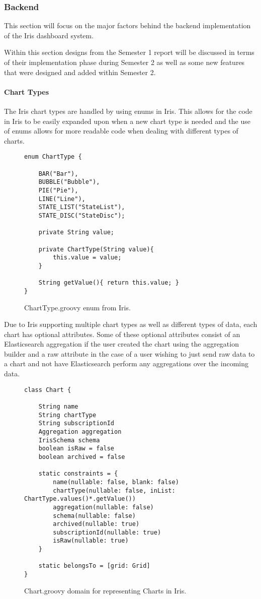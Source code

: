 \documentclass[12pt,a4paper,titlepage]{report}
\begin{document}
\subsubsection{Backend}
This section will focus on the major factors behind the backend implementation of the Iris dashboard system.

Within this section designs from the Semester 1 report will be discussed in terms of their implementation phase during Semester 2 as well as some new features that were designed and added within Semester 2.
\paragraph{Chart Types}
The Iris chart types are handled by using enums in Iris. This allows for the code in Iris to be easily expanded upon when a new chart type is needed and the use of enums allows for more readable code when dealing with different types of charts.

\begin{figure}[H]
\begin{tcolorbox}
\begin{verbatim}
enum ChartType {

    BAR("Bar"),
    BUBBLE("Bubble"),
    PIE("Pie"),
    LINE("Line"),
    STATE_LIST("StateList"),
    STATE_DISC("StateDisc");

    private String value;

    private ChartType(String value){
        this.value = value;
    }

    String getValue(){ return this.value; }
}
\end{verbatim}
\end{tcolorbox}
\caption{ChartType.groovy enum from Iris.}
\end{figure}
Due to Iris supporting multiple chart types as well as different types of data, each chart has optional attributes. Some of these optional attributes consist of an Elasticsearch aggregation if the user created the chart using the aggregation builder and a raw attribute in the case of a user wishing to just send raw data to a chart and not have Elasticsearch perform any aggregations over the incoming data.
\begin{figure}[H]
\begin{tcolorbox}
\begin{verbatim}
class Chart {

    String name
    String chartType
    String subscriptionId
    Aggregation aggregation
    IrisSchema schema
    boolean isRaw = false
    boolean archived = false

    static constraints = {
        name(nullable: false, blank: false)
        chartType(nullable: false, inList: ChartType.values()*.getValue())
        aggregation(nullable: false)
        schema(nullable: false)
        archived(nullable: true)
        subscriptionId(nullable: true)
        isRaw(nullable: true)
    }

    static belongsTo = [grid: Grid]
}
\end{verbatim}
\end{tcolorbox}
\caption{Chart.groovy domain for representing Charts in Iris.}
\end{figure}
\end{document}
